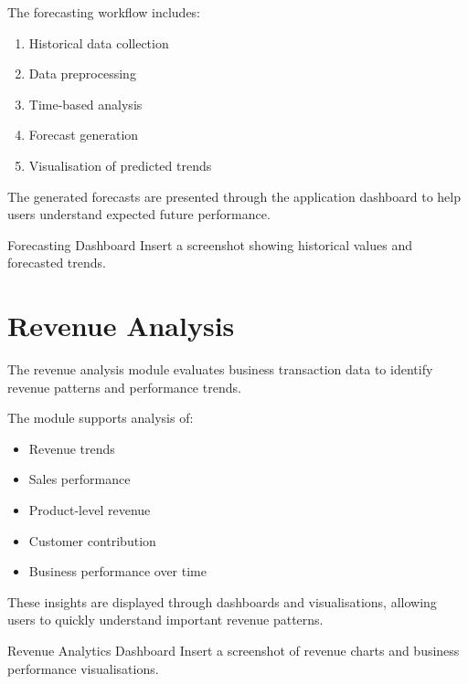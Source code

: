 \documentclass[12pt,a4paper]{report}
\begin{document}
The forecasting workflow includes:

\begin{enumerate}
    \item Historical data collection
    \item Data preprocessing
    \item Time-based analysis
    \item Forecast generation
    \item Visualisation of predicted trends
\end{enumerate}

The generated forecasts are presented through the application
dashboard to help users understand expected future performance.

\begin{screenshotplaceholder}{Forecasting Dashboard}
Insert a screenshot showing historical values and forecasted trends.
\end{screenshotplaceholder}


\section{Revenue Analysis}

The revenue analysis module evaluates business transaction data to
identify revenue patterns and performance trends.

The module supports analysis of:

\begin{itemize}
    \item Revenue trends
    \item Sales performance
    \item Product-level revenue
    \item Customer contribution
    \item Business performance over time
\end{itemize}

These insights are displayed through dashboards and visualisations,
allowing users to quickly understand important revenue patterns.

\begin{screenshotplaceholder}{Revenue Analytics Dashboard}
Insert a screenshot of revenue charts and business performance
visualisations.
\end{screenshotplaceholder}
\end{document}
